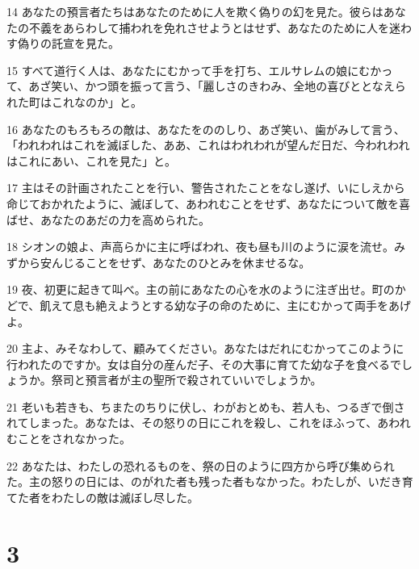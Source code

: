 \par 14 あなたの預言者たちはあなたのために人を欺く偽りの幻を見た。彼らはあなたの不義をあらわして捕われを免れさせようとはせず、あなたのために人を迷わす偽りの託宣を見た。
\par 15 すべて道行く人は、あなたにむかって手を打ち、エルサレムの娘にむかって、あざ笑い、かつ頭を振って言う、「麗しさのきわみ、全地の喜びととなえられた町はこれなのか」と。
\par 16 あなたのもろもろの敵は、あなたをののしり、あざ笑い、歯がみして言う、「われわれはこれを滅ぼした、ああ、これはわれわれが望んだ日だ、今われわれはこれにあい、これを見た」と。
\par 17 主はその計画されたことを行い、警告されたことをなし遂げ、いにしえから命じておかれたように、滅ぼして、あわれむことをせず、あなたについて敵を喜ばせ、あなたのあだの力を高められた。
\par 18 シオンの娘よ、声高らかに主に呼ばわれ、夜も昼も川のように涙を流せ。みずから安んじることをせず、あなたのひとみを休ませるな。
\par 19 夜、初更に起きて叫べ。主の前にあなたの心を水のように注ぎ出せ。町のかどで、飢えて息も絶えようとする幼な子の命のために、主にむかって両手をあげよ。
\par 20 主よ、みそなわして、顧みてください。あなたはだれにむかってこのように行われたのですか。女は自分の産んだ子、その大事に育てた幼な子を食べるでしょうか。祭司と預言者が主の聖所で殺されていいでしょうか。
\par 21 老いも若きも、ちまたのちりに伏し、わがおとめも、若人も、つるぎで倒されてしまった。あなたは、その怒りの日にこれを殺し、これをほふって、あわれむことをされなかった。
\par 22 あなたは、わたしの恐れるものを、祭の日のように四方から呼び集められた。主の怒りの日には、のがれた者も残った者もなかった。わたしが、いだき育てた者をわたしの敵は滅ぼし尽した。

\chapter{3}


